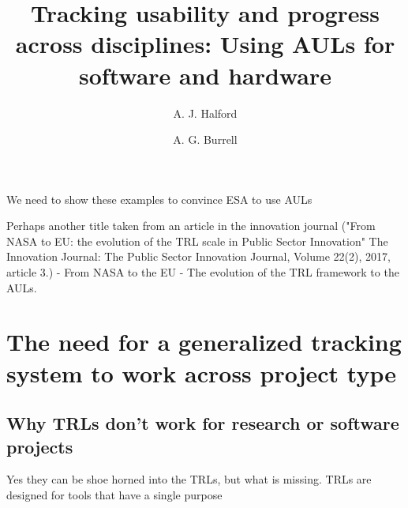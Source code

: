 \documentclass[referee,a4paper,12pt,traditabstract]{swsc}
\begin{document}
\begin{linenumbers}  

   \title{Tracking usability and progress across disciplines: Using AULs for software and hardware}

   


   \author{A. J. Halford  \and A. G. Burrell 
          }




  \abstract
   {We need to show these examples to convince ESA to use AULs}        %
   


   \maketitle
Perhaps another title taken from an article in the innovation journal ("From NASA to EU: the evolution of the TRL scale in Public Sector Innovation"  The Innovation Journal: The Public Sector Innovation Journal, Volume 22(2), 2017, article 3.) - From NASA to the EU - The evolution of the TRL framework to the AULs. 


\section{The need for a generalized tracking system to work across project type}

\subsection{Why TRLs don't work for research or software projects}

Yes they can be shoe horned into the TRLs, but what is missing. TRLs are designed for tools that have a single purpose 



\end{linenumbers}
\end{document}
